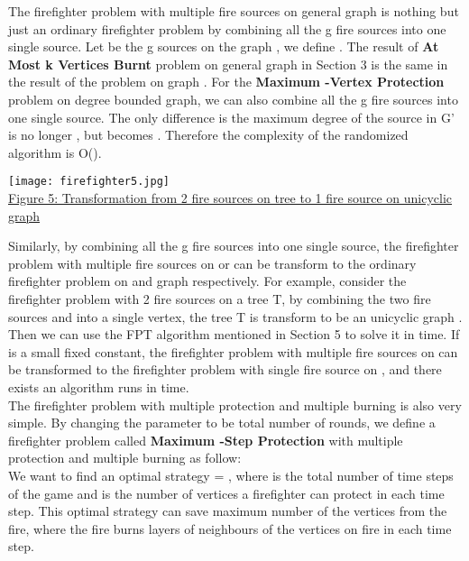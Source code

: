 \documentclass[11pt,letter]{article}
\begin{document}
The firefighter problem with multiple fire sources on general graph is nothing but just an ordinary firefighter problem by combining all the g fire sources into one single source. Let  be the g sources on the graph ,  we define . The result of \textbf{At Most k Vertices Burnt} problem on general graph  in Section 3 is the same in the result of the problem on graph . For the \textbf{Maximum -Vertex Protection} problem on degree bounded graph, we can also combine all the g fire sources into one single source. The only difference is the maximum degree of the source in G' is no longer , but becomes . Therefore the complexity of the randomized algorithm is O().\\

\begin{center}
\texttt{[image: firefighter5.jpg]}\\
\underline{Figure 5: Transformation from 2 fire sources on tree to 1 fire source on unicyclic graph}
\end{center}

Similarly, by combining all the g fire sources into one single source, the firefighter problem with multiple fire sources on  or  can be transform to the ordinary firefighter problem on  and  graph respectively. For example, consider the firefighter problem with 2 fire sources on a tree T,  by combining the two fire sources  and  into a single vertex, the tree T is transform to be an unicyclic graph . Then we can use the FPT algorithm mentioned in Section 5 to solve it in  time. If  is a small fixed constant, the firefighter problem with multiple fire sources on   can be transformed to the firefighter problem with single fire source on , and there exists an algorithm runs in  time.\\



The firefighter problem with multiple protection and multiple burning is also very simple. By changing the parameter  to be total number of rounds, we define a firefighter problem called  \textbf{Maximum -Step Protection} with multiple protection and multiple burning as follow: \\

We want to find an optimal strategy  = , where  is the total number of time steps of the game and  is the number of vertices a firefighter can protect in each time step. This optimal strategy  can save maximum number of the vertices from the fire, where the fire burns  layers of neighbours of the vertices on fire in each time step.\\
\end{document}
